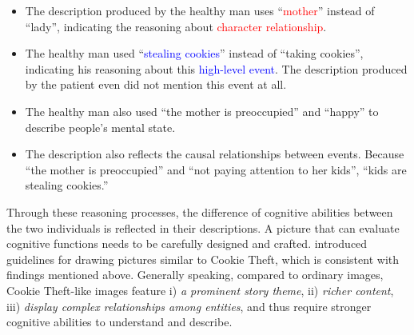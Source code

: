 \begin{itemize}
	\item The description produced by the healthy man uses ``\textcolor{red}{mother}'' instead of ``lady'', indicating the reasoning about \textcolor{red}{character relationship}. 
	\item The healthy man used ``\textcolor{blue}{stealing cookies}'' instead of ``taking cookies'', indicating his reasoning about this \textcolor{blue}{high-level event}. 
    The description produced by the patient even did not mention this event at all. 
    \item The healthy man also used ``the mother is \textcolor{c2}{preoccupied}'' and ``\textcolor{c2}{happy}'' to describe people's \textcolor{c2}{mental state}. 
    \item The description also reflects the  \textcolor{c1}{causal relationships between events}.
    Because ``\textcolor{c1}{the mother is preoccupied}'' and ``\textcolor{c1}{not paying attention to her kids}'', ``\textcolor{c1}{kids are stealing cookies.}''
\end{itemize}
Through these reasoning processes, the difference of cognitive abilities between the two individuals is reflected in their descriptions. 
A picture that can evaluate cognitive functions needs to be carefully designed and crafted.
\citet{tasnim-etal-2022-depac} introduced guidelines for drawing pictures similar to Cookie Theft, which is consistent with findings mentioned above.
Generally speaking, compared to ordinary images, Cookie Theft-like images feature i) \textit{a prominent story theme}, ii) \textit{richer content}, iii) \textit{display complex relationships among entities}, and thus require stronger cognitive abilities to understand and describe.


